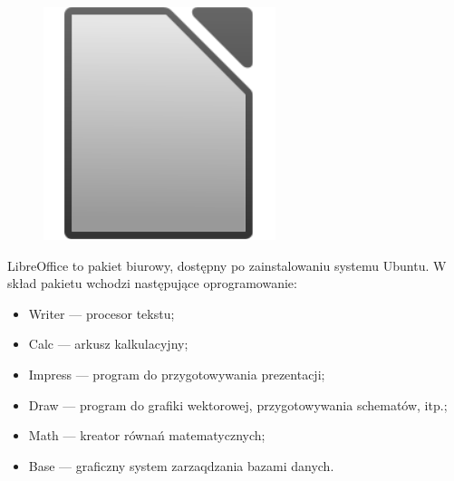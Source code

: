 \begin{figure}
	\vspace{-10pt}
	\includegraphics[width=\linewidth]{images/ikony_libreoffice.png}
\end{figure}

LibreOffice to pakiet biurowy, dostępny po zainstalowaniu systemu Ubuntu. W skład pakietu wchodzi następujące oprogramowanie:
\begin{itemize}
\item \textcolor{ubuntu_orange}{Writer} --- procesor tekstu;
\item \textcolor{ubuntu_orange}{Calc} --- arkusz kalkulacyjny;
\item \textcolor{ubuntu_orange}{Impress} --- program do przygotowywania prezentacji;
\item \textcolor{ubuntu_orange}{Draw} --- program do grafiki wektorowej, przygotowywania schematów, itp.;
\item \textcolor{ubuntu_orange}{Math} --- kreator równań matematycznych;
\item \textcolor{ubuntu_orange}{Base} --- graficzny system zarzaqdzania bazami danych.
\end{itemize}
